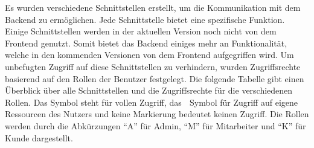 Es wurden verschiedene Schnittstellen erstellt, um die Kommunikation mit dem Backend zu ermöglichen.
Jede Schnittstelle bietet eine spezifische Funktion.
Einige Schnittstellen werden in der aktuellen Version noch nicht von dem Frontend genutzt.
Somit bietet das Backend einiges mehr an Funktionalität, welche in den kommenden Versionen von dem Frontend
aufgegriffen wird.
Um unbefugten Zugriff auf diese Schnittstellen zu verhindern,
wurden Zugriffsrechte basierend auf den Rollen der Benutzer festgelegt.
Die folgende Tabelle gibt einen Überblick über alle Schnittstellen und die Zugriffsrechte für die verschiedenen Rollen.
Das \checkmark Symbol steht für vollen Zugriff,
das \textcircled{} Symbol für Zugriff auf eigene Ressourcen des Nutzers und keine Markierung bedeutet keinen Zugriff.
Die Rollen werden durch die Abkürzungen \enquote{A} für Admin,
\enquote{M} für Mitarbeiter und \enquote{K} für Kunde dargestellt.

